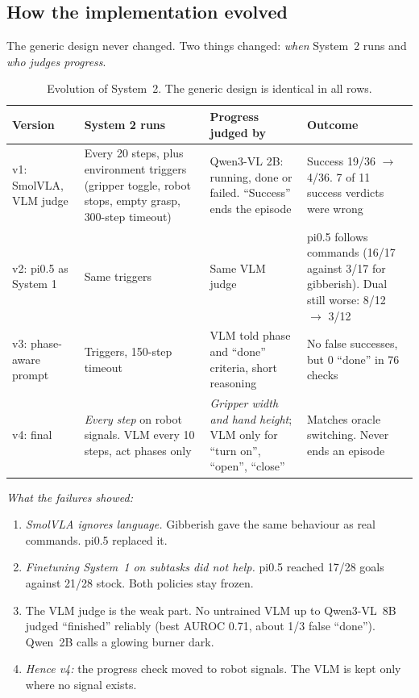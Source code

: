 \documentclass[10pt,a4paper]{article}
\newcommand{\key}[1]{#1}%
\begin{document}
\subsection{How the implementation evolved}\label{sec:evolution}
The generic design never changed. Two things changed: \emph{when} System~2 runs and \emph{who judges progress}.

\begin{table}[h]
\centering\scriptsize
\begin{tabularx}{\linewidth}{@{}p{1.7cm}p{3.6cm}p{3.5cm}X@{}}
\toprule
Version & System 2 runs & Progress judged by & Outcome\\
\midrule
v1: SmolVLA, VLM judge & Every 20 steps, plus environment triggers (gripper toggle, robot stops, empty grasp, 300-step timeout) & Qwen3-VL 2B: running, done or failed. ``Success'' ends the episode & Success 19/36 $\to$ 4/36. 7 of 11 success verdicts were wrong\\
\midrule
v2: pi0.5 as System 1 & Same triggers & Same VLM judge & pi0.5 follows commands (16/17 against 3/17 for gibberish). Dual still worse: 8/12 $\to$ 3/12\\
\midrule
v3: phase-aware prompt & Triggers, 150-step timeout & VLM told phase and ``done'' criteria, short reasoning & No false successes, but 0 ``done'' in 76 checks\\
\midrule
\key{v4: final} & \emph{Every step} on robot signals. VLM every 10 steps, act phases only & \emph{Gripper width and hand height}; VLM only for ``turn on'', ``open'', ``close'' & Matches oracle switching. Never ends an episode\\
\bottomrule
\end{tabularx}
\caption{Evolution of System~2. The generic design is identical in all rows.}
\label{tab:evolution}
\end{table}

\emph{What the failures showed:}
\begin{enumerate}
\item \emph{SmolVLA ignores language.} Gibberish gave the same behaviour as real commands. pi0.5 replaced it.
\item \emph{Finetuning System~1 on subtasks did not help.} pi0.5 reached 17/28 goals against 21/28 stock. Both policies stay frozen.
\item \key{The VLM judge is the weak part.} No untrained VLM up to Qwen3-VL~8B judged ``finished'' reliably (best AUROC 0.71, about 1/3 false ``done''). Qwen~2B calls a glowing burner dark.
\item \emph{Hence v4:} the progress check moved to robot signals. The VLM is kept only where no signal exists.
\end{enumerate}
\end{document}
